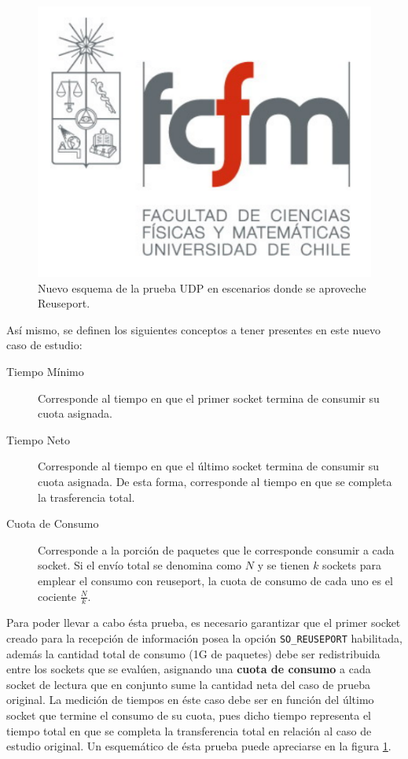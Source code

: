 \begin{figure}[!h]
	\centering
	\includegraphics[scale=.3]{imagenes/fcfm}
	\caption{Nuevo esquema de la prueba UDP en escenarios donde se aproveche Reuseport.}
	\label{fig:casoPruebaReuseport}
\end{figure}

Así mismo, se definen los siguientes conceptos a tener presentes en este nuevo caso de estudio:
\begin{description}
\item[Tiempo Mínimo] Corresponde al tiempo en que el primer socket termina de consumir su cuota asignada.
\item[Tiempo Neto] Corresponde al tiempo en que el último socket termina de consumir su cuota asignada. De esta forma, corresponde al tiempo en que se completa la trasferencia total.
\item[Cuota de Consumo] Corresponde a la porción de paquetes que le corresponde consumir a cada socket. Si el envío total se denomina como $N$ y se tienen $k$ sockets para emplear el consumo con reuseport, la cuota de consumo de cada uno es el cociente $\frac{N}{k}$.
\end{description}

Para poder llevar a cabo ésta prueba, es necesario garantizar que el primer socket creado para la recepción de información posea la opción \verb=SO_REUSEPORT= habilitada, además la cantidad total de consumo (1G de paquetes) debe ser redistribuida entre los sockets que se evalúen, asignando una \textbf{cuota de consumo} a cada socket de lectura que en conjunto sume la cantidad neta del caso de prueba original. La medición de tiempos en éste caso debe ser en función del último socket que termine el consumo de su cuota, pues dicho tiempo representa el tiempo total en que se completa la transferencia total en relación al caso de estudio original. Un esquemático de ésta prueba puede apreciarse en la figura \ref{fig:casoPruebaReuseport}.

